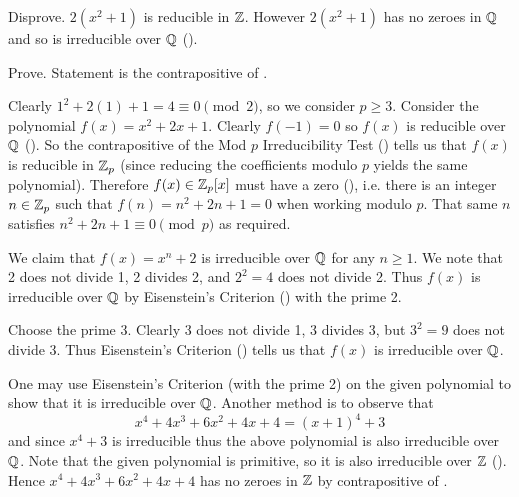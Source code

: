 \begin{questions}
    \item \begin{partquestions}{\alph*}
        \item Disprove. $2(x^2+1)$ is reducible in $\mathbb{Z}$. However $2(x^2+1)$ has no zeroes in $\mathbb{Q}$ and so is irreducible over $\mathbb{Q}$ ().

        \item Prove. Statement is the contrapositive of .
    \end{partquestions}

    \item Clearly $1^2 + 2(1) + 1 = 4 \equiv 0 \pmod2$, so we consider $p \geq 3$. Consider the polynomial $f(x) = x^2 + 2x + 1$. Clearly $f(-1) = 0$ so $f(x)$ is reducible over $\mathbb{Q}$ (). So the contrapositive of the Mod $p$ Irreducibility Test () tells us that $f(x)$ is reducible in $\mathbb{Z}_p$ (since reducing the coefficients modulo $p$ yields the same polynomial). Therefore $f(x) \in \mathbb{Z}_p[x]$ must have a zero (), i.e. there is an integer $n \in \mathbb{Z}_p$ such that $f(n) = n^2 + 2n + 1 = 0$ when working modulo $p$. That same $n$ satisfies $n^2 + 2n + 1 \equiv 0 \pmod{p}$ as required.

    \item We claim that $f(x) = x^n + 2$ is irreducible over $\mathbb{Q}$ for any $n \geq 1$. We note that 2 does not divide 1, 2 divides 2, and $2^2 = 4$ does not divide 2. Thus $f(x)$ is irreducible over $\mathbb{Q}$ by Eisenstein's Criterion () with the prime 2.

    \item \begin{partquestions}{\roman*}
        \item Choose the prime 3. Clearly 3 does not divide 1, 3 divides 3, but $3^2 = 9$ does not divide 3. Thus Eisenstein's Criterion () tells us that $f(x)$ is irreducible over $\mathbb{Q}$.

        \item One may use Eisenstein's Criterion (with the prime 2) on the given polynomial to show that it is irreducible over $\mathbb{Q}$. Another method is to observe that
        \[
            x^4 + 4x^3 + 6x^2 + 4x + 4 = (x+1)^4 + 3
        \]
        and since $x^4 + 3$ is irreducible thus the above polynomial is also irreducible over $\mathbb{Q}$. Note that the given polynomial is primitive, so it is also irreducible over $\mathbb{Z}$ (). Hence $x^4 + 4x^3 + 6x^2 + 4x + 4$ has no zeroes in $\mathbb{Z}$ by contrapositive of .


\end{partquestions}
\end{questions}
